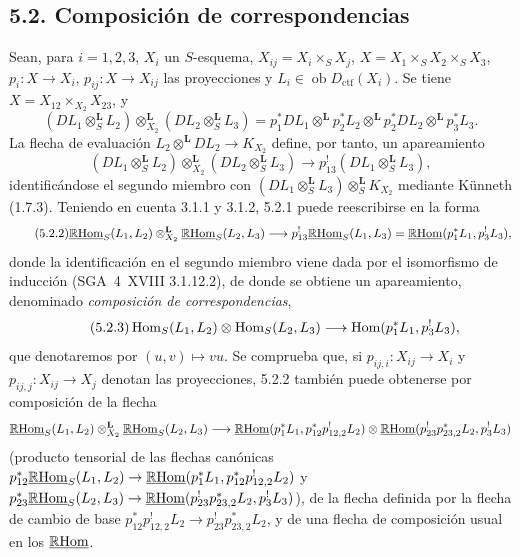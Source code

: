\subsection*{5.2. Composición de correspondencias}

Sean, para $i=1,2,3$, $X_i$ un $S$-esquema, $X_{ij}=X_i\times_SX_j$, $X=X_1\times_SX_2\times_SX_3$, $p_i:X\to X_i$, $p_{ij}:X\to X_{ij}$ las proyecciones y $L_i\in\operatorname{ob}D_{\mathrm{ctf}}(X_i)$. Se tiene $X=X_{12}\times_{X_2}X_{23}$, y
\[
(DL_1\otimes_S^{\mathbf L}L_2)\otimes_{X_2}^{\mathbf L}(DL_2\otimes_S^{\mathbf L}L_3)
=p_1^*DL_1\otimes^{\mathbf L}p_2^*L_2\otimes^{\mathbf L}p_2^*DL_2\otimes^{\mathbf L}p_3^*L_3.
\]
La flecha de evaluación $L_2\otimes^{\mathbf L}DL_2\to K_{X_2}$ define, por tanto, un apareamiento
\begin{equation}
\tag{5.2.1}
(DL_1\otimes_S^{\mathbf L}L_2)\otimes_{X_2}^{\mathbf L}(DL_2\otimes_S^{\mathbf L}L_3)\longrightarrow p_{13}^!(DL_1\otimes_S^{\mathbf L}L_3),
\end{equation}
identificándose el segundo miembro con $(DL_1\otimes_S^{\mathbf L}L_3)\otimes_S^{\mathbf L}K_{X_2}$ mediante Künneth (1.7.3). Teniendo en cuenta 3.1.1 y 3.1.2, 5.2.1 puede reescribirse en la forma
\begin{equation}
\tag{5.2.2}
\underline{\mathbb{R}\mathrm{Hom}}_S(L_1,L_2)\otimes_{X_2}^{\mathbf L}\underline{\mathbb{R}\mathrm{Hom}}_S(L_2,L_3)\longrightarrow p_{13}^!\underline{\mathbb{R}\mathrm{Hom}}_S(L_1,L_3)=\underline{\mathbb{R}\mathrm{Hom}}(p_1^*L_1,p_3^!L_3),
\end{equation}
donde la identificación en el segundo miembro viene dada por el isomorfismo de inducción (SGA~4~XVIII 3.1.12.2), de donde se obtiene un apareamiento, denominado \emph{composición de correspondencias},
\begin{equation}
\tag{5.2.3}
\operatorname{Hom}_S(L_1,L_2)\otimes\operatorname{Hom}_S(L_2,L_3)\longrightarrow\operatorname{Hom}(p_1^*L_1,p_3^!L_3),
\end{equation}
que denotaremos por $(u,v)\mapsto vu$. Se comprueba que, si $p_{ij,i}:X_{ij}\to X_i$ y $p_{ij,j}:X_{ij}\to X_j$ denotan las proyecciones, 5.2.2 también puede obtenerse por composición de la flecha
\[
\underline{\mathbb{R}\mathrm{Hom}}_S(L_1,L_2)\otimes_{X_2}^{\mathbf L}\underline{\mathbb{R}\mathrm{Hom}}_S(L_2,L_3)
\longrightarrow
\underline{\mathbb{R}\mathrm{Hom}}(p_1^*L_1,p_{12}^*p_{12,2}^!L_2)
\otimes
\underline{\mathbb{R}\mathrm{Hom}}(p_{23}^!p_{23,2}^*L_2,p_3^!L_3)
\]
(producto tensorial de las flechas canónicas $p_{12}^*\underline{\mathbb{R}\mathrm{Hom}}_S(L_1,L_2)\to\underline{\mathbb{R}\mathrm{Hom}}(p_1^*L_1,p_{12}^*p_{12,2}^!L_2)$ y $p_{23}^*\underline{\mathbb{R}\mathrm{Hom}}_S(L_2,L_3)\to\underline{\mathbb{R}\mathrm{Hom}}(p_{23}^!p_{23,2}^*L_2,p_3^!L_3)$), de la flecha definida por la flecha de cambio de base $p_{12}^*p_{12,2}^!L_2\to p_{23}^!p_{23,2}^*L_2$, y de una flecha de composición usual en los $\underline{\mathbb{R}\mathrm{Hom}}$.

